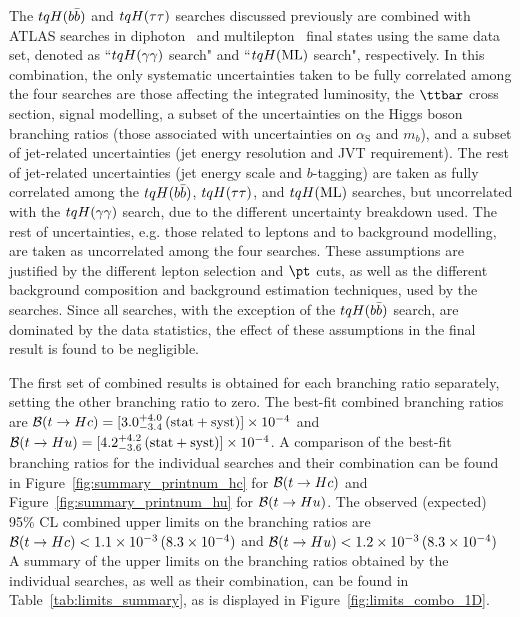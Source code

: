The $tqH(b\bar{b})$ and $tqH(\tau\tau)$ searches discussed previously are combined with ATLAS searches in 
diphoton~\cite{Aaboud:2017mfd} and multilepton~\cite{Aaboud:2018pob} final states using the same data set, 
denoted as ``$tqH(\gamma\gamma)$ search" and ``$tqH(\mathrm{ML})$ search", respectively.
In this combination, the only systematic uncertainties taken to be fully correlated among the four searches are 
those affecting the integrated luminosity, the $\ttbar$ cross section, signal modelling, a subset of the uncertainties
on the Higgs boson branching ratios (those associated with uncertainties on $\alpha_\mathrm{S}$ and $m_b$), 
and a subset of jet-related uncertainties (jet energy resolution and JVT requirement). 
The rest of jet-related uncertainties (jet energy scale and $b$-tagging) are taken as fully correlated among 
the $tqH(b\bar{b})$, $tqH(\tau\tau)$, and $tqH(\mathrm{ML})$ searches, but uncorrelated with the $tqH(\gamma\gamma)$ search, due to the different
uncertainty breakdown used. The rest of uncertainties, e.g. those related to leptons and to background modelling, are taken
as uncorrelated among the four searches. These assumptions are justified by the different lepton selection and $\pt$ cuts, 
as well as the different background composition and background estimation techniques, used by the searches.
Since all searches,  with the exception of the $tqH(b\bar{b})$ search, are dominated 
by the data statistics, the effect of these assumptions in the final result is found to be negligible.


The first set of combined results is obtained for each branching ratio separately, setting the other branching ratio to zero.
The best-fit combined branching ratios are $\mathcal{B}(t\to Hc)=[3.0^{+4.0}_{-3.4}\,(\mathrm{stat+syst})] \times 10^{-4}$ and 
$\mathcal{B}(t\to Hu)=[4.2^{+4.2}_{-3.6}\,(\mathrm{stat+syst})] \times 10^{-4}$.  
A comparison of the best-fit branching ratios for the individual searches and their combination can be found in Figure~\ref{fig:summary_printnum_hc} 
for $\mathcal{B}(t\to Hc)$ and Figure~\ref{fig:summary_printnum_hu} for $\mathcal{B}(t\to Hu)$.
The observed (expected) 95\% CL combined upper limits on the branching ratios are 
$\mathcal{B}(t\to Hc)<1.1 \times 10^{-3}\,(8.3 \times 10^{-4})$ and $\mathcal{B}(t\to Hu)<1.2 \times 10^{-3}\,(8.3 \times 10^{-4})$
A summary of the upper limits on the branching ratios obtained by the individual searches, as well as their combination, 
can be found in Table~\ref{tab:limits_summary}, as is displayed in Figure~\ref{fig:limits_combo_1D}. 

